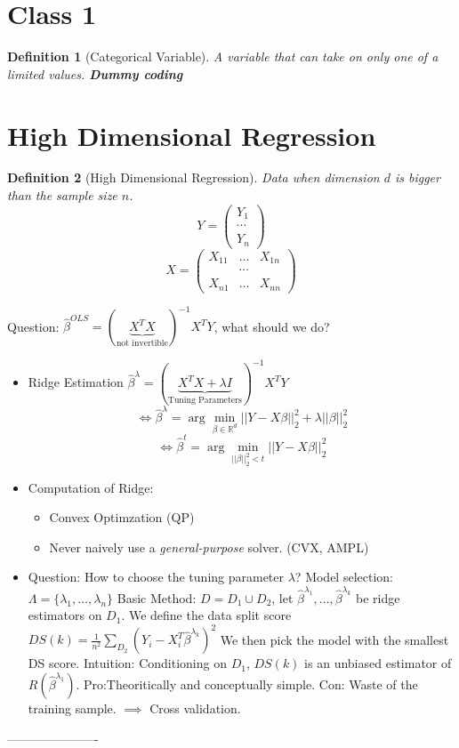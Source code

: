 \documentclass{article}
\newtheorem{definition}{Definition}
\newenvironment{class}[1]
{\section*{Class #1}}
{ ----------------------}
\begin{document}
\begin{class}{1}
\begin{definition} [Categorical Variable]
  A variable that can take on only one of a limited values.
  \textbf{Dummy coding}
\end{definition}

\section{High Dimensional Regression}
\begin{definition}[High Dimensional Regression]
  Data when dimension $d$ is bigger than the sample size $n$.
  \[
    Y = \left(
      \begin{array}{c}
        Y_1\\\cdots\\Y_n
      \end{array}
    \right)
  \]
  \[
    X = \left(
      \begin{array}{ccc}
        X_{11}&\ldots&X_{1n}\\&\cdots\\X_{n1}&\ldots&X_{nn}
      \end{array}
    \right)
  \]
\end{definition}
Question: $\hat \beta^{OLS} = (\underbrace{X^TX}_{\text{not invertible}})^{-1}X^TY$, what should we do?
\begin{itemize}
\item Ridge Estimation $\hat \beta^{\lambda} =  (\underbrace{X^TX + \lambda I}_{\text{Tuning Parameters}})^{-1}X^TY$
  $$\iff \hat \beta^{\lambda} = \arg\min_{\beta \in \mathbb R^d} ||Y - X\beta||_2^2 + \lambda ||\beta||_2^2$$
  $$\iff \hat \beta^{t} = \arg\min_{||\beta||_2^2 < t} ||Y - X\beta||_2^2$$
  
\item Computation of Ridge:
  \begin{itemize}
  \item Convex Optimzation (QP)
  \item Never naively use a \textit{general-purpose} solver. (CVX, AMPL)
  \end{itemize}
\item Question: How to choose the tuning parameter $\lambda$?
  Model selection: $\Lambda = \{ \lambda_1, \ldots, \lambda_n \}$
  Basic Method: $D = D_1 \cup D_2$, let $\hat \beta^{\lambda_1}, \ldots, \hat \beta^{\lambda_k}$ be ridge estimators on $D_1$.
  We define the data split score $DS(k) = \frac1{n^2} \sum_{D_2} (Y_i - X_i^T \hat \beta^{\lambda_k})^2$
  We then pick the model with the smallest DS score.
  Intuition: Conditioning on $D_1$, $DS(k)$ is an unbiased estimator of $R(\hat \beta^{\lambda_1})$.
  Pro:Theoritically and conceptually simple.
  Con: Waste of the training sample. $\implies$ Cross validation.
\end{itemize}
\end{class}
\end{document}
